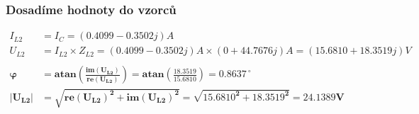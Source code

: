 \subsubsection{Dosadíme hodnoty do vzorců}
\begin{align*}
I_{L2} &= I_C = (0.4099 - 0.3502j) A\\
U_{L2} &= I_{L2}\times Z_{L2} = (0.4099 - 0.3502j) A \times (0 + 44.7676j) A = (15.6810 + 18.3519j) V\\ \\
\boldsymbol{\varphi }&=\boldsymbol{ atan(\frac {im(U_{L2})}{re(U_{L2})}) = atan(\frac {18.3519}{15.6810})  = 0.8637^{~\circ}}\\
\boldsymbol{\vert U_{L2}\vert }&=\boldsymbol{ \sqrt{ re(U_{L2})^2 + im(U_{L2})^2 } = \sqrt{15.6810^2 + 18.3519^2} = 24.1389 V}
\end{align*}
